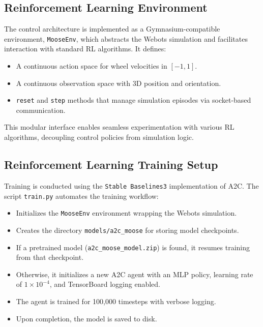 \documentclass[11pt,twocolumn]{article}
\begin{document}
\subsection{Reinforcement Learning Environment}

The control architecture is implemented as a Gymnasium-compatible environment, \texttt{MooseEnv}, which abstracts the Webots simulation and facilitates interaction with standard RL algorithms. It defines:

\begin{itemize}
    \item A continuous action space for wheel velocities in \([-1, 1]\).
    \item A continuous observation space with 3D position and orientation.
    \item \texttt{reset} and \texttt{step} methods that manage simulation episodes via socket-based communication.
\end{itemize}

This modular interface enables seamless experimentation with various RL algorithms, decoupling control policies from simulation logic.

\subsection{Reinforcement Learning Training Setup}

Training is conducted using the \texttt{Stable Baselines3} implementation of A2C. The script \texttt{train.py} automates the training workflow:

\begin{itemize}
    \item Initializes the \texttt{MooseEnv} environment wrapping the Webots simulation.
    \item Creates the directory \texttt{models/a2c\_moose} for storing model checkpoints.
    \item If a pretrained model (\texttt{a2c\_moose\_model.zip}) is found, it resumes training from that checkpoint.
    \item Otherwise, it initializes a new A2C agent with an MLP policy, learning rate of $1 \times 10^{-4}$, and TensorBoard logging enabled.
    \item The agent is trained for 100,000 timesteps with verbose logging.
    \item Upon completion, the model is saved to disk.
\end{itemize}
\end{document}

